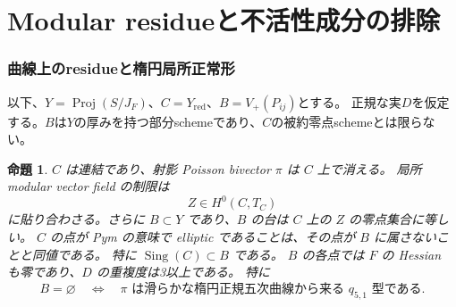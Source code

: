 \documentclass[11pt,a4paper]{ltjsarticle}
\newtheorem{proposition}[theorem]{命題}
\theoremstyle{remark}\newtheorem{remark}[theorem]{注意}
\begin{document}
\part{Modular residueと不活性成分の排除}
\section{曲線上のresidueと楕円局所正常形}\label{sec:modular}
以下、$Y=\operatorname{Proj}(S/J_F)$、$C=Y_{\mathrm{red}}$、$B=V_+(P_{ij})$とする。
正規な実$D$を仮定する。$B$は$Y$の厚みを持つ部分schemeであり、$C$の被約零点schemeとは限らない。


\begin{proposition}\label{prop:normal-modular-base-v15}
$C$ は連結であり、射影 Poisson bivector $\pi$ は $C$ 上で消える。
局所 modular vector field の制限は
\[
 Z\in H^0(C,T_C)
\]
に貼り合わさる。さらに $B\subset Y$ であり、$B$ の台は $C$ 上の $Z$ の零点集合に等しい。
$C$ の点が Pym の意味で elliptic であることは、その点が $B$ に属さないことと同値である。
特に $\operatorname{Sing}(C)\subset B$ である。
$B$ の各点では $F$ の Hessian も零であり、$D$ の重複度は3以上である。
特に
\[
 B=\varnothing\quad\Longleftrightarrow\quad
 \pi\text{ は滑らかな楕円正規五次曲線から来る }q_{5,1}\text{ 型である}.
\]
\end{proposition}
\end{document}
